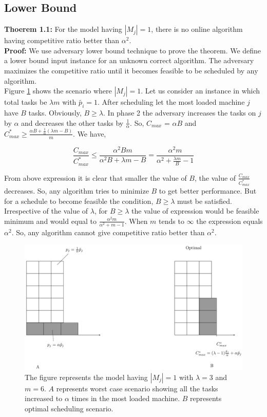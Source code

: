 \documentclass[10pt, conference, compsocconf]{IEEEtran}
\begin{document}
                                                                                      
\subsection{Lower Bound}

\textbf{Thoerem 1.1:} For the model having $|M_j| = 1$, there
is no online algorithm having competitive ratio better than $\alpha^{2} $.\\
\textbf{Proof:} We use adversary lower bound technique to
prove the theorem. We define a lower bound input
instance for an unknown correct algorithm. The
adversary maximizes the competitive ratio until it
becomes feasible to be scheduled by any algorithm.\\
 
Figure \ref{fig:rara} shows the scenario where $|M_j|=1$.  Let us consider an instance in which total tasks be $\lambda m$ with $\tilde{p_i}=1$. After scheduling let the most loaded machine $j$ have $B$ tasks. Obviously, $B \geq \lambda$. In phase 2 the adversary  increases the tasks on $j$ by $\alpha$ and decreases the other tasks by $\frac{1}{\alpha}$. So, $ C_{max}$ = $\alpha B$ and ${C^{*}_{max}}\geq \frac{\alpha B + \frac{1}{\alpha }  (\lambda  m - B) }{m}$. We have,
 
 \begin{equation}\nonumber
\frac{C_{max}}{C^{*}_{max}}\leq \frac{\alpha^{2} B m }{\alpha^{2} B + \lambda m - B}=\frac{\alpha^{2}  m }{\alpha^{2}  + \frac{\lambda m}{B}  - 1}
 \end{equation} 
 
  From above expression it is clear that smaller the value of $B$, the value of $\frac{C_{max}}{C^{*}_{max}}$ decreases. So, any algorithm
  tries to minimize $B$ to get better performance.  But for a schedule to become feasible the condition, $B \geq \lambda$ must  be satisfied. Irrespective of the value of $\lambda$, for $ B \geq \lambda $ the value of expression would be feasible minimum and would equal to   $\frac{\alpha^{2}m }{\alpha^{2} + m-1}$. When $m$ tends to $\infty$ the expression  equals $\alpha^2$. So, any algorithm cannot give competitive ratio better than $\alpha^2$.  
  
  
  \begin{figure}[htp]
  \centering
  \includegraphics[width= 8 cm]{fig}
  \caption{ The figure represents the model having $|M_j|= 1$ with
  $\lambda = 3$ and $m = 6$. $A$ represents worst case scenario showing all the tasks increased to $\alpha$ times in the most loaded machine. $B$ represents   optimal scheduling scenario.  }
  \label{fig:rara}
  \end{figure}
 
\end{document}
